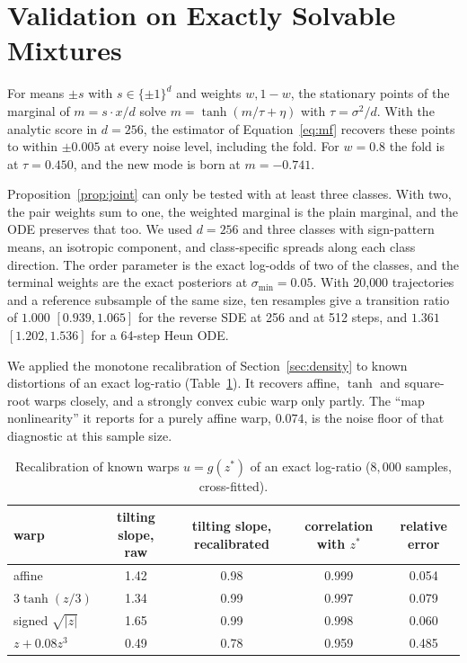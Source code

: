 \section{Validation on Exactly Solvable Mixtures}
\label{app:controls}

For means $\pm s$ with $s\in\{\pm1\}^d$ and weights $w,1-w$, the stationary points of the marginal of $m=s\cdot x/d$ solve $m=\tanh(m/\tau+\eta)$ with $\tau=\sigma^2/d$. With the analytic score in $d=256$, the estimator of Equation~\eqref{eq:mf} recovers these points to within $\pm0.005$ at every noise level, including the fold. For $w=0.8$ the fold is at $\tau=0.450$, and the new mode is born at $m=-0.741$.

Proposition~\ref{prop:joint} can only be tested with at least three classes. With two, the pair weights sum to one, the weighted marginal is the plain marginal, and the ODE preserves that too. We used $d=256$ and three classes with sign-pattern means, an isotropic component, and class-specific spreads along each class direction. The order parameter is the exact log-odds of two of the classes, and the terminal weights are the exact posteriors at $\sigma_{\min}=0.05$. With 20{,}000 trajectories and a reference subsample of the same size, ten resamples give a transition ratio of $1.000$ $[0.939,1.065]$ for the reverse SDE at 256 and at 512 steps, and $1.361$ $[1.202,1.536]$ for a 64-step Heun ODE.

We applied the monotone recalibration of Section~\ref{sec:density} to known distortions of an exact log-ratio (Table~\ref{tab:calval}). It recovers affine, $\tanh$ and square-root warps closely, and a strongly convex cubic warp only partly. The ``map nonlinearity'' it reports for a purely affine warp, $0.074$, is the noise floor of that diagnostic at this sample size.

\begin{table}[h]
\centering
\caption{Recalibration of known warps $u=g(z^\ast)$ of an exact log-ratio ($8{,}000$ samples, cross-fitted).}
\label{tab:calval}
\small
\begin{tabular}{lcccc}
\toprule
warp & tilting slope, raw & tilting slope, recalibrated & correlation with $z^\ast$ & relative error \\
\midrule
affine & 1.42 & 0.98 & 0.999 & 0.054 \\
$3\tanh(z/3)$ & 1.34 & 0.99 & 0.997 & 0.079 \\
signed $\sqrt{|z|}$ & 1.65 & 0.99 & 0.998 & 0.060 \\
$z+0.08z^3$ & 0.49 & 0.78 & 0.959 & 0.485 \\
\bottomrule
\end{tabular}
\end{table}

